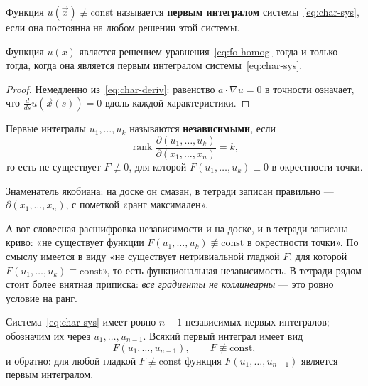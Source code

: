 \begin{definition}
Функция $u(\vec x) \not\equiv \mathrm{const}$ называется \textbf{первым
интегралом} системы~\eqref{eq:char-sys}, если она постоянна на любом решении
этой системы.
\end{definition}

\begin{proposition}
Функция $u(x)$ является решением уравнения~\eqref{eq:fo-homog} тогда и только
тогда, когда она является первым интегралом системы~\eqref{eq:char-sys}.
\end{proposition}

\begin{proof}
Немедленно из~\eqref{eq:char-deriv}: равенство $\bar a \cdot \nabla u = 0$ в
точности означает, что $\frac{d}{ds} u(\vec x(s)) = 0$ вдоль каждой
характеристики.
\end{proof}

\begin{definition}
Первые интегралы $u_1,\dots,u_k$ называются \textbf{независимыми}, если
\[
  \operatorname{rank}
  \frac{\partial(u_1,\dots,u_k)}{\partial(x_1,\dots,x_n)} = k ,
\]
то есть не существует $F \not\equiv 0$, для которой
$F(u_1,\dots,u_k) \equiv 0$ в окрестности точки.
\end{definition}

\begin{warn}
Знаменатель якобиана: на доске он смазан, в тетради записан правильно —
$\partial(x_1,\dots,x_n)$, с пометкой «ранг максимален».

\medskip
А вот словесная расшифровка независимости и на доске, и в тетради записана
криво: «не существует функции $F(u_1,\dots,u_k) \not\equiv \mathrm{const}$ в
окрестности точки». По смыслу имеется в виду «не существует нетривиальной
гладкой $F$, для которой $F(u_1,\dots,u_k) \equiv \mathrm{const}$», то есть
функциональная независимость. В тетради рядом стоит более внятная приписка:
\emph{все градиенты не коллинеарны} — это ровно условие на ранг.
\end{warn}

\begin{theorem}\label{thm:first-integrals}
Система~\eqref{eq:char-sys} имеет ровно $n-1$ независимых первых интегралов;
обозначим их через $u_1,\dots,u_{n-1}$. Всякий первый интеграл имеет вид
\[
  F(u_1,\dots,u_{n-1}), \qquad F \not\equiv \mathrm{const} ,
\]
и обратно: для любой гладкой $F \not\equiv \mathrm{const}$ функция
$F(u_1,\dots,u_{n-1})$ является первым интегралом.
\end{theorem}

